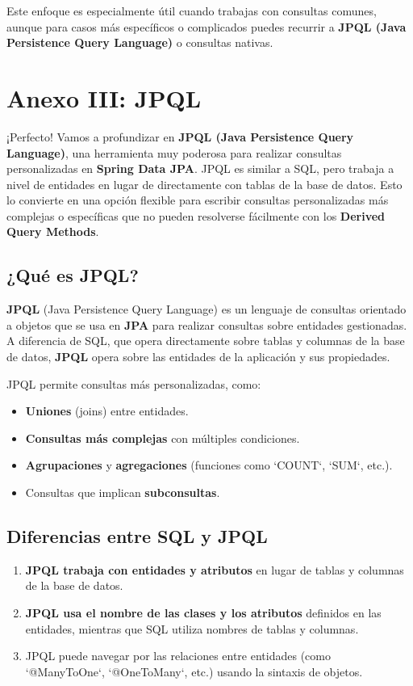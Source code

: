 \documentclass[11pt]{article}
\begin{document}
Este enfoque es especialmente útil cuando trabajas con consultas comunes, aunque para casos más específicos o complicados puedes recurrir a \textbf{\textbf{JPQL (Java Persistence Query Language)}} o consultas nativas.


\section{Anexo III: JPQL}
\label{sec:org1f84c67}

¡Perfecto! Vamos a profundizar en \textbf{\textbf{JPQL (Java Persistence Query Language)}}, una herramienta muy poderosa para realizar consultas personalizadas en \textbf{\textbf{Spring Data JPA}}.
JPQL es similar a SQL, pero trabaja a nivel de entidades en lugar de directamente con tablas de la base de datos. Esto lo convierte en una opción flexible para escribir consultas personalizadas más complejas o específicas que no pueden resolverse fácilmente con los \textbf{\textbf{Derived Query Methods}}.

\subsection{¿Qué es JPQL?}
\label{sec:org16174d1}
\textbf{\textbf{JPQL}} (Java Persistence Query Language) es un lenguaje de consultas orientado a objetos que se usa en \textbf{\textbf{JPA}} para realizar consultas sobre entidades gestionadas. A diferencia de SQL, que opera directamente sobre tablas y columnas de la base de datos, \textbf{\textbf{JPQL}} opera sobre las entidades de la aplicación y sus propiedades.

JPQL permite consultas más personalizadas, como:
\begin{itemize}
\item \textbf{\textbf{Uniones}} (joins) entre entidades.
\item \textbf{\textbf{Consultas más complejas}} con múltiples condiciones.
\item \textbf{\textbf{Agrupaciones}} y \textbf{\textbf{agregaciones}} (funciones como `COUNT`, `SUM`, etc.).
\item Consultas que implican \textbf{\textbf{subconsultas}}.
\end{itemize}

\subsection{Diferencias entre SQL y JPQL}
\label{sec:org47bf307}
\begin{enumerate}
\item \textbf{\textbf{JPQL trabaja con entidades y atributos}} en lugar de tablas y columnas de la base de datos.
\item \textbf{\textbf{JPQL usa el nombre de las clases y los atributos}} definidos en las entidades, mientras que SQL utiliza nombres de tablas y columnas.
\item JPQL puede navegar por las relaciones entre entidades (como `@ManyToOne`, `@OneToMany`, etc.) usando la sintaxis de objetos.
\end{enumerate}
\end{document}
